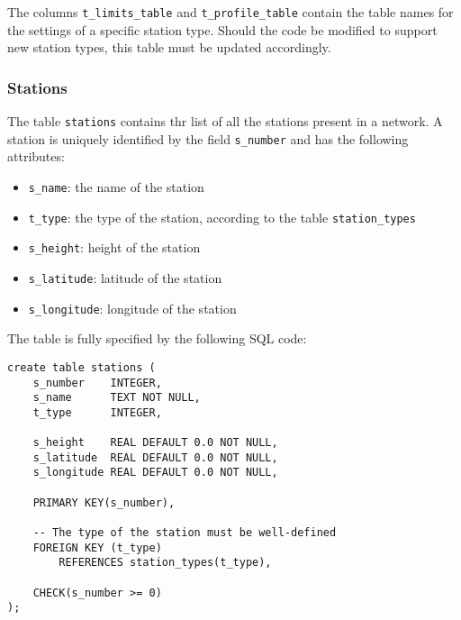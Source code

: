 \documentclass[10pt]{article}
\begin{document}
The columns \texttt{t\_limits\_table} and \texttt{t\_profile\_table} contain the table names for the settings of a specific station type. Should the code be modified to support new station types, this table must be updated accordingly.


\subsubsection{Stations}
The table \texttt{stations} contains thr list of all the stations present in a
network. A station is uniquely identified by the field \texttt{s\_number} and has
the following attributes:
\begin{itemize}
    \item \texttt{s\_name}: the name of the station
    \item \texttt{t\_type}: the type of the station, according to the table \texttt{station\_types} 
    \item \texttt{s\_height}: height of the station
    \item \texttt{s\_latitude}: latitude of the station
    \item \texttt{s\_longitude}: longitude of the station
\end{itemize}

The table is fully specified by the following SQL code:
\begin{verbatim}
create table stations (
    s_number    INTEGER,
    s_name      TEXT NOT NULL,
    t_type      INTEGER,

    s_height    REAL DEFAULT 0.0 NOT NULL,
    s_latitude  REAL DEFAULT 0.0 NOT NULL,
    s_longitude REAL DEFAULT 0.0 NOT NULL,

    PRIMARY KEY(s_number),
    
    -- The type of the station must be well-defined
    FOREIGN KEY (t_type)
        REFERENCES station_types(t_type),
    
    CHECK(s_number >= 0)
);
\end{verbatim}

\end{document}
